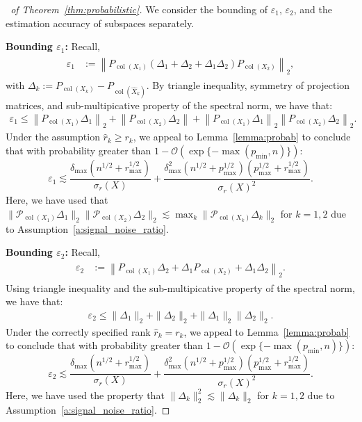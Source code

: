 \documentclass{amsart}
\DeclareMathOperator*{\col}{col}
\begin{document}
\begin{proof}[~of Theorem~\ref{thm:probabilistic}] {We consider the bounding of $\varepsilon_1$, $\varepsilon_2$, and the estimation accuracy of subspaces separately.  

\vspace{0.1in}
\noindent \textbf{Bounding $\varepsilon_1$:} Recall,
\begin{eqnarray*}
\begin{aligned}
    \varepsilon_1 &:= \left\|P_{{\col (X_1)}}\left(\Delta_1+\Delta_2+\Delta_1\Delta_2\right)P_{{\col (X_2)}}\right\|_2,
\end{aligned}
\end{eqnarray*}
with $\Delta_k := P_{{\col (X_k)}} - P_{\col (\widehat{X}_k)}$. By triangle inequality, symmetry of projection matrices, and sub-multipicative property of the spectral norm, we have that:
\begin{eqnarray*}
\varepsilon_1 \leq \left\|P_{{\col (X_1)}}\Delta_1\right\|_2+\left\|P_{{\col (X_2)}}\Delta_2\right\|+\left\|P_{{\col (X_1)}}\Delta_1\right\|_2\left\|P_{{\col (X_2)}}\Delta_2\right\|_2.
\end{eqnarray*}
Under the assumption $\widehat r_k \geq r_k$, we appeal to Lemma~\ref{lemma:probab} to conclude that with probability greater than $1-\mathcal{O}(\exp\{-\max(p_{\min},n)\})$:
$$
\varepsilon_1 \lesssim \frac{\delta_{\max}(n^{1/2}+r_{\max}^{1/2})}{\sigma_{r}(X)} + \frac{\delta_{\max}^2(n^{1/2}+p_{\max}^{1/2})(p_{\max}^{1/2}+r_{\max}^{1/2})}{\sigma_{r}(X)^2}.
$$
Here, we have used that $\|\mathcal{P}_{\col(X_1)}\Delta_1\|_2 \|\mathcal{P}_{\col(X_2)}\Delta_2\|_2 \lesssim \max_k\|\mathcal{P}_{\col(X_k)}\Delta_k\|_2$ for $k = 1,2$ due to Assumption~\ref{a:signal_noise_ratio}.

\vspace{0.1in}
\noindent \textbf{Bounding $\varepsilon_2$:} Recall,
\begin{eqnarray*}
\begin{aligned}
  \varepsilon_2 &:= \left\|P_{{\col (X_1)}}\Delta_2 + \Delta_1P_{{\col (X_2)}}+\Delta_1\Delta_2\right\|_2.
\end{aligned}
\end{eqnarray*}
Using triangle inequality and the sub-multipicative property of the spectral norm, we have that:
\begin{align*}
\varepsilon_2 \leq \|\Delta_1\|_2+ \|\Delta_2\|_2 + \|\Delta_1\|_2 \|\Delta_2\|_2.
\end{align*}
Under the correctly specified rank $\widehat r_k = r_k$, we appeal to Lemma~\ref{lemma:probab} to conclude that with probability greater than $1-\mathcal{O}(\exp\{-\max(p_{\min},n)\})$:
$$
\varepsilon_2 \lesssim \frac{\delta_{\max}(n^{1/2}+r_{\max}^{1/2})}{\sigma_{r}(X)} + \frac{\delta_{\max}^2(n^{1/2}+p_{\max}^{1/2})(p_{\max}^{1/2}+r_{\max}^{1/2})}{\sigma_{r}(X)^2}.
$$
Here, we have used the property that $\|\Delta_k\|_2^2 \lesssim \|\Delta_k\|_2$ for $k = 1,2$ due to Assumption~\ref{a:signal_noise_ratio}. 

}
\end{proof}
\end{document}
